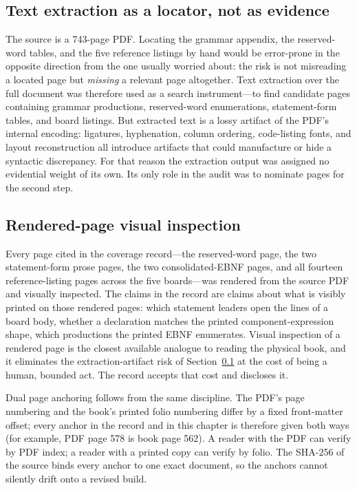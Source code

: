 \subsection{Text extraction as a locator, not as evidence}\label{ch10:method-extraction}

The source is a 743-page PDF. Locating the grammar appendix, the reserved-word tables, and the five reference listings by hand would be error-prone in the opposite direction from the one usually worried about: the risk is not misreading a located page but \emph{missing} a relevant page altogether. Text extraction over the full document was therefore used as a search instrument---to find candidate pages containing grammar productions, reserved-word enumerations, statement-form tables, and board listings. But extracted text is a lossy artifact of the PDF's internal encoding: ligatures, hyphenation, column ordering, code-listing fonts, and layout reconstruction all introduce artifacts that could manufacture or hide a syntactic discrepancy. For that reason the extraction output was assigned no evidential weight of its own. Its only role in the audit was to nominate pages for the second step.

\subsection{Rendered-page visual inspection}\label{ch10:method-render}

Every page cited in the coverage record---the reserved-word page, the two statement-form prose pages, the two consolidated-EBNF pages, and all fourteen reference-listing pages across the five boards---was rendered from the source PDF and visually inspected. The claims in the record are claims about what is visibly printed on those rendered pages: which statement leaders open the lines of a board body, whether a declaration matches the printed component-expression shape, which productions the printed EBNF enumerates. Visual inspection of a rendered page is the closest available analogue to reading the physical book, and it eliminates the extraction-artifact risk of Section~\ref{ch10:method-extraction} at the cost of being a human, bounded act. The record accepts that cost and discloses it.

Dual page anchoring follows from the same discipline. The PDF's page numbering and the book's printed folio numbering differ by a fixed front-matter offset; every anchor in the record and in this chapter is therefore given both ways (for example, PDF page 578 is book page 562). A reader with the PDF can verify by PDF index; a reader with a printed copy can verify by folio. The SHA-256 of the source binds every anchor to one exact document, so the anchors cannot silently drift onto a revised build.

